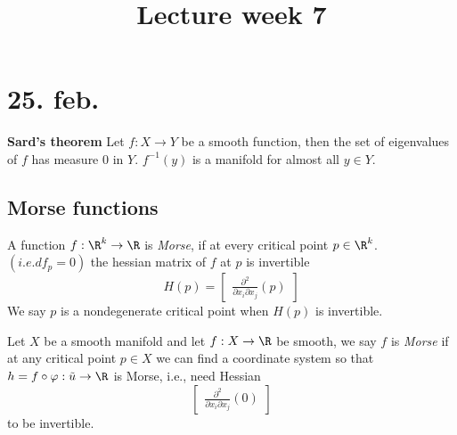 \title{Lecture week 7}
\maketitle
\section{25. feb.}
\begin{theorem}
  \textbf{Sard's theorem}
  \newline Let $f: X \to Y$ be a smooth function, then the set of eigenvalues of $f$ has measure $0$ in $Y$.
  $f ^{-1}(y)$ is a manifold for almost all $y\in Y$.
\end{theorem}

\subsection*{Morse functions}
A function $f: \R^k \to \R$ is \emph{Morse}, if at every critical point $p \in \R^k$.
  \newline $\left(i.e. df_p =0  \right)$ the hessian matrix of $f$ at $p$ is invertible
  $$ H(p)=
  \begin{bmatrix}
      \frac{\partial^2}{\partial x_i \partial x_j}(p)
  \end{bmatrix}
  $$
We say $p$ is a nondegenerate critical point when $H(p)$ is invertible.

\begin{definition}
  Let $X$ be a smooth manifold and let $f: X \to \R$ be smooth, we say $f$ is \emph{Morse} if at any critical point $p\in X$ we can find a coordinate system so that $h= f\circ \varphi : \tilde{u}\to \R$ is Morse, i.e., need Hessian
    $$
    \begin{bmatrix}
        \frac{\partial^2}{\partial x_i \partial x_j}(0)
    \end{bmatrix}
    $$
  to be invertible.
\end{definition}

